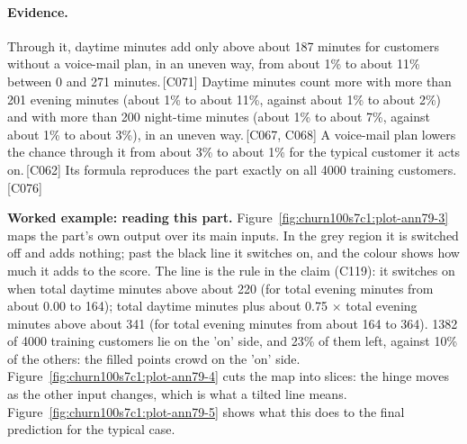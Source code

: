 \documentclass[a4paper,10pt]{article}
\newif\ifreviewmarks
\newcommand{\reviewrule}{\noindent{\color{BrickRed}\rule{\linewidth}{0.8pt}}}
\newenvironment{drafted}[1][]{%
  \ifreviewmarks\par\addvspace{\medskipamount}\reviewrule\par\nopagebreak
  \noindent{\color{BrickRed}\sffamily\footnotesize\textbf{Thesis Draft}\quad #1\hfill review}\par\nopagebreak\smallskip\fi}{%
  \ifreviewmarks\par\smallskip\noindent{\color{BrickRed}\sffamily\footnotesize end of thesis draft}\par\nopagebreak\reviewrule\par\medskip\fi}
\begin{document}
\begin{drafted}[plain-language layer: churn100-s7-c1]
\paragraph{Evidence.} Through it, daytime minutes add only above about 187 minutes for customers without a voice-mail plan, in an uneven way, from about 1\% to about 11\% between 0 and 271 minutes.\,{\scriptsize\textcolor{NavyBlue}{[C071]}} Daytime minutes count more with more than 201 evening minutes (about 1\% to about 11\%, against about 1\% to about 2\%) and with more than 200 night-time minutes (about 1\% to about 7\%, against about 1\% to about 3\%), in an uneven way.\,{\scriptsize\textcolor{NavyBlue}{[C067, C068]}} A voice-mail plan lowers the chance through it from about 3\% to about 1\% for the typical customer it acts on.\,{\scriptsize\textcolor{NavyBlue}{[C062]}} Its formula reproduces the part exactly on all 4000 training customers.\,{\scriptsize\textcolor{NavyBlue}{[C076]}}
\par{}
\par\medskip\noindent\textbf{Worked example: reading this part.} Figure~\ref{fig:churn100s7c1:plot-ann79-3} maps the part's own output over its main inputs. In the grey region it is switched off and adds nothing; past the black line it switches on, and the colour shows how much it adds to the score. The line is the rule in the claim (C119): it switches on when total daytime minutes above about 220 (for total evening minutes from about 0.00 to 164); total daytime minutes plus about 0.75 $\times$ total evening minutes above about 341 (for total evening minutes from about 164 to 364). 1382 of 4000 training customers lie on the 'on' side, and 23\% of them left, against 10\% of the others: the filled points crowd on the 'on' side. Figure~\ref{fig:churn100s7c1:plot-ann79-4} cuts the map into slices: the hinge moves as the other input changes, which is what a tilted line means. Figure~\ref{fig:churn100s7c1:plot-ann79-5} shows what this does to the final prediction for the typical case.\par
\par{}

\end{drafted}
\end{document}
